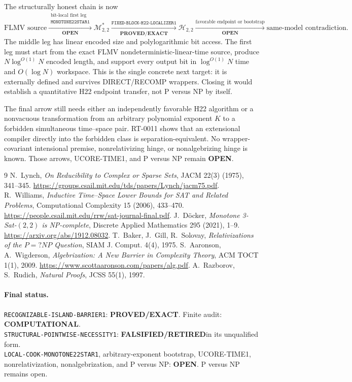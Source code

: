 \documentclass[11pt]{article}
\newcommand{\Htwo}{\mathcal H_{2,2}}
\newcommand{\EXACT}{\textbf{PROVED/EXACT}}
\newcommand{\OPEN}{\textbf{OPEN}}
\newcommand{\RETIRED}{\textbf{FALSIFIED/RETIRED}}
\newcommand{\COMP}{\textbf{COMPUTATIONAL}}
\begin{document}
The structurally honest chain is now
\[
 \text{FLMV source}
 \xrightarrow[\OPEN]{\substack{\text{bit-local first leg}\\
                               \texttt{MONOTONE22STAR1}}}
 \mathcal M^*_{2,2}
 \xrightarrow[\EXACT]{\texttt{FIXED-BLOCK-H22-LOCALIZER1}}
 \Htwo
 \xrightarrow[\OPEN]{\text{favorable endpoint or bootstrap}}
 \text{same-model contradiction}.                         \tag{4}
\]
The middle leg has linear encoded size and polylogarithmic bit access.  The
first leg must start from the exact FLMV nondeterministic-linear-time source,
produce $N\log^{O(1)}N$ encoded length, and support every output bit in
$\log^{O(1)}N$ time and $O(\log N)$ workspace.  This is the single concrete
next target: it is externally defined and survives DIRECT/RECOMP wrappers.
Closing it would establish a quantitative H22 endpoint transfer, not P
versus NP by itself.

The final arrow still needs either an independently favorable H22 algorithm
or a nonvacuous transformation from an arbitrary polynomial exponent $K$ to
a forbidden simultaneous time--space pair.  RT-0011 shows that an extensional
compiler directly into the forbidden class is separation-equivalent.  No
wrapper-covariant intensional premise, nonrelativizing hinge, or
nonalgebrizing hinge is known.  Those arrows, UCORE-TIME1, and P versus NP
remain \OPEN.

\begin{thebibliography}{9}
 N.~Lynch,
\emph{On Reducibility to Complex or Sparse Sets}, JACM 22(3) (1975),
341--345. \url{https://groups.csail.mit.edu/tds/papers/Lynch/jacm75.pdf}.
 R.~Williams,
\emph{Inductive Time--Space Lower Bounds for SAT and Related Problems},
Computational Complexity 15 (2006), 433--470.
\url{https://people.csail.mit.edu/rrw/sat-journal-final.pdf}.
 J.~D\"ocker,
\emph{Monotone 3-Sat-$(2,2)$ is NP-complete}, Discrete Applied Mathematics
295 (2021), 1--9. \url{https://arxiv.org/abs/1912.08032}.
 T.~Baker, J.~Gill, R.~Solovay,
\emph{Relativizations of the $P=?NP$ Question}, SIAM J. Comput. 4(4), 1975.
 S.~Aaronson, A.~Wigderson,
\emph{Algebrization: A New Barrier in Complexity Theory}, ACM TOCT 1(1),
2009. \url{https://www.scottaaronson.com/papers/alg.pdf}.
 A.~Razborov, S.~Rudich,
\emph{Natural Proofs}, JCSS 55(1), 1997.
\end{thebibliography}

\paragraph{Final status.}
\texttt{RECOGNIZABLE-ISLAND-BARRIER1}: \EXACT.  Finite audit: \COMP.\\
\texttt{STRUCTURAL-POINTWISE-NECESSITY1}: \RETIRED in its unqualified form.\\
\texttt{LOCAL-COOK-MONOTONE22STAR1}, arbitrary-exponent bootstrap,
UCORE-TIME1, nonrelativization, nonalgebrization, and P versus NP: \OPEN.
P versus NP remains open.

\end{document}
